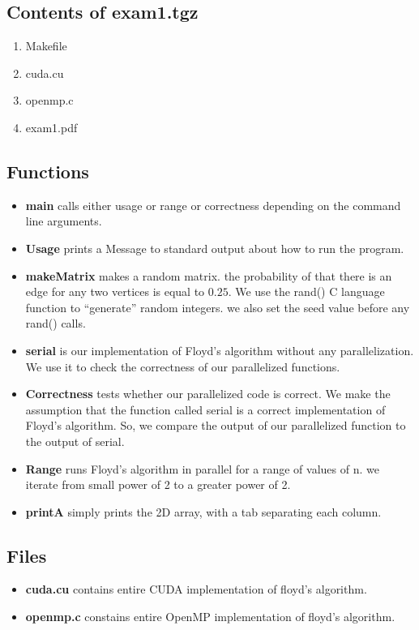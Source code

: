 \documentclass[12pt]{article}
\begin{document}
\subsection*{Contents of exam1.tgz}
\begin{enumerate}
	\item Makefile
	\item cuda.cu
	\item openmp.c
	\item exam1.pdf
\end{enumerate}

\newpage
\subsection*{Functions}
\begin{itemize}
  \item \textbf{main} calls either usage or range or correctness depending on the 
command line arguments. 
  \item \textbf{Usage} prints a Message to standard output about how to run the program.
  \item \textbf{makeMatrix} makes a random matrix. the probability of that there is an edge 
for any two vertices is equal to $0.25$. We use the rand() C language
function to ``generate'' random integers. we also set the seed value 
before any rand() calls.
  \item \textbf{serial} is our implementation of Floyd's algorithm without any parallelization.
We use it to check the correctness of our parallelized functions.
  \item \textbf{Correctness} tests whether our parallelized code 
is correct. We make the assumption that the function called serial 
is a correct implementation of Floyd's algorithm. So, we compare the 
output of our parallelized function to the output of serial. 
  \item \textbf{Range} runs Floyd's algorithm in parallel for a range of values
of n. we iterate from small power of 2 to a greater power of 2. 
  \item \textbf{printA} simply prints the 2D array, with a tab separating each column.
\end{itemize}
\subsection*{Files}
\begin{itemize}
  \item \textbf{cuda.cu} contains entire CUDA implementation of floyd's algorithm.
  \item \textbf{openmp.c} constains entire OpenMP implementation of floyd's algorithm.
\end{itemize}
\newpage
\end{document}
